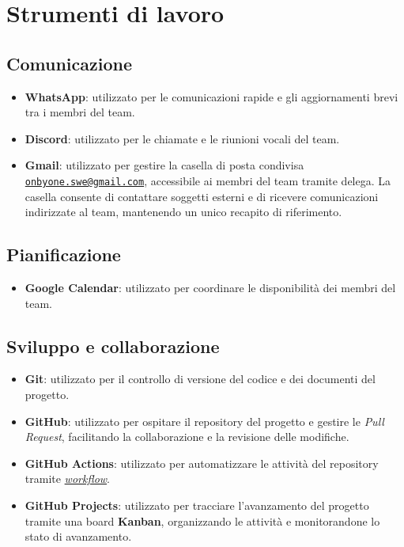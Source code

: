 \documentclass[11pt, a4paper]{article}
\begin{document}
\section{Strumenti di lavoro}

\subsection{Comunicazione}
\begin{itemize}
    \item \textbf{WhatsApp}: utilizzato per le comunicazioni rapide e gli aggiornamenti brevi tra i membri del team.
    \item \textbf{Discord}: utilizzato per le chiamate e le riunioni vocali del team.
    \item \textbf{Gmail}: utilizzato per gestire la casella di posta condivisa \href{mailto:onbyone.swe@gmail.com}{\texttt{onbyone.swe@gmail.com}}, accessibile ai membri del team tramite delega. La casella consente di contattare soggetti esterni e di ricevere comunicazioni indirizzate al team, mantenendo un unico recapito di riferimento.
\end{itemize}

\subsection{Pianificazione}
\begin{itemize}
    \item \textbf{Google Calendar}: utilizzato per coordinare le disponibilità dei membri del team.
\end{itemize}

\subsection{Sviluppo e collaborazione}
\begin{itemize}
    \item \textbf{Git}: utilizzato per il controllo di versione del codice e dei documenti del progetto.
    \item \textbf{GitHub}: utilizzato per ospitare il repository del progetto e gestire le \textit{Pull Request}, facilitando la collaborazione e la revisione delle modifiche.
    \item \textbf{GitHub Actions}: utilizzato per automatizzare le attività del repository tramite \href{https://github.com/On-By-One-Team/On-By-One.github.io/tree/main/.github/workflows}{\textit{workflow}}.
    \item \textbf{GitHub Projects}: utilizzato per tracciare l'avanzamento del progetto tramite una board \textbf{Kanban}, organizzando le attività e monitorandone lo stato di avanzamento.
\end{itemize}
\end{document}
